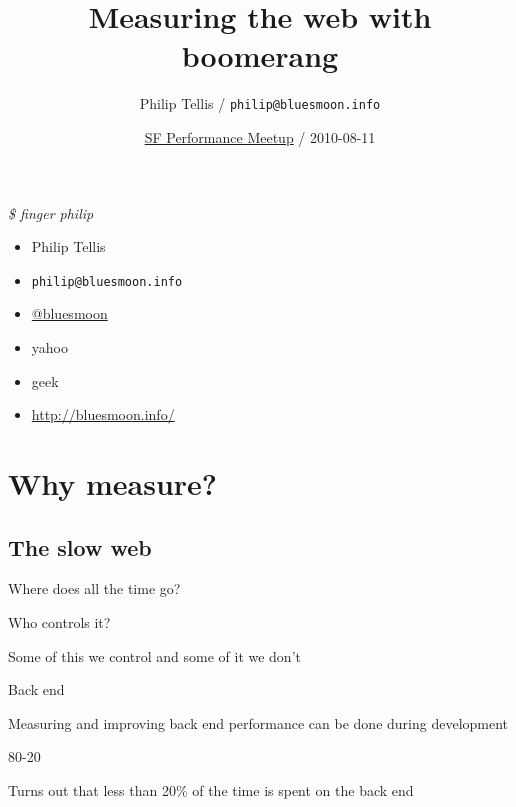 \documentclass{beamer}
\author{Philip Tellis / \texttt{philip@bluesmoon.info}}
\title{Measuring the web with boomerang}
\date{\href{http://www.meetup.com/SF-Web-Performance-Group/calendar/14252574/}{SF Performance Meetup} / 2010-08-11}
\begin{document}
\begin{frame}
  \titlepage
\end{frame}


\begin{frame}{\textit{\$ finger philip}}
  \begin{itemize}
  \item Philip Tellis
  \item \small{\texttt{philip@bluesmoon.info}}
  \item \href{http://twitter.com/bluesmoon}{@bluesmoon}
  \item yahoo
  \item geek
  \item \href{http://bluesmoon.info/}{http://bluesmoon.info/}
  \end{itemize}
\end{frame}


\section{Why measure?}
\subsection{The slow web}

\begin{frame}{Where does all the time go?}
\end{frame}

\begin{frame}{Who controls it?}
  \begin{center}
  Some of this we control and some of it we don't
  \end{center}
\end{frame}

\begin{frame}{Back end}
  \begin{center}
  Measuring and improving back end performance can be done during development
  \end{center}
\end{frame}

\begin{frame}{80-20}
  \begin{center}
  Turns out that less than 20\% of the time is spent on the back end
  \end{center}
\end{frame}
\end{document}
